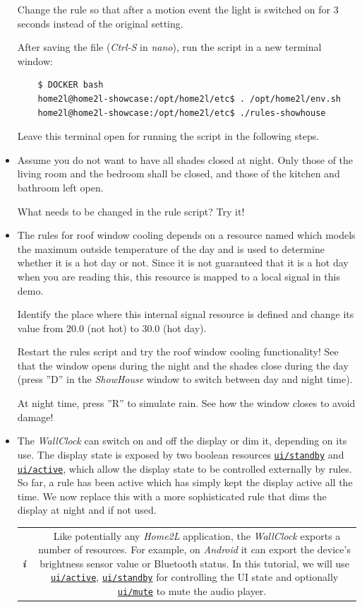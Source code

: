 \documentclass[12pt,english,parskip=half,headheight=19pt]{scrreprt}
\newcommand{\lst}[1]{\colorbox{lstbackground}{\footnotesize\code{#1}}}
\newcommand{\infobox}[1]{
  \par
  \medskip
  \hfill
  \setlength\arrayrulewidth{1pt}
  \begin{tabular}[t]{c|c|}
    \parbox{1.8em}{\hfill\textit{\Huge\textbf{i}\,}}
    &
    \,\parbox{0.89\linewidth}{\setlength{\parskip}{0.5em} \small #1}\,
  \end{tabular}
  \medskip
  \par
}
\newcommand{\refrc}[1]{\hyperref[rc:#1]{\texttt{#1}}}
\begin{document}
\begin{itemize}[$\blacktriangleright$]
  Change the rule so that after a motion event the light is switched on for 3 seconds instead of
  the original setting.

  After saving the file (\textit{Ctrl-S} in \textit{nano}), run the script in a new terminal window:
  \begin{lstlisting}
    $ DOCKER bash
    home2l@home2l-showcase:/opt/home2l/etc$ . /opt/home2l/env.sh
    home2l@home2l-showcase:/opt/home2l/etc$ ./rules-showhouse
  \end{lstlisting}

  Leave this terminal open for running the script in the following steps.

\item
  Assume you do not want to have all shades closed at night. Only those of the living room
  and the bedroom shall be closed, and those of the kitchen and bathroom left open.

  What needs to be changed in the rule script? Try it!

\item
  The rules for roof window cooling depends on a resource named \lst{rcTempDayMaxOutside}
  which models the maximum outside temperature of the day and is used to determine whether
  it is a hot day or not. Since it is not guaranteed that it is a hot day when you are reading
  this, this resource is mapped to a local signal in this demo.

  Identify the place where this internal signal resource is defined and change its value from
  20.0 (not hot) to 30.0 (hot day).

  Restart the rules script and try the roof window cooling functionality!
  See that the window opens during the night and the shades close during the day
  (press ''D'' in the \textit{ShowHouse} window to switch between day and night time).

  At night time, press ''R'' to simulate rain. See how the window closes to avoid damage!

\item
  The \textit{WallClock} can switch on and off the display or dim it, depending on its use. The display state
  is exposed by two boolean resources \refrc{ui/standby} and \refrc{ui/active}, which allow the display state to
  be controlled externally by rules. So far, a rule has been active which has simply kept the display active all the
  time. We now replace this with a more sophisticated rule that dims the display at night and if not used.

  \infobox{
    Like potentially any \textit{Home2L} application, the \textit{WallClock}
    exports a number of resources. For example, on \textit{Android} it can export
    the device's brightness sensor value or Bluetooth status. In this tutorial, we will use
    \refrc{ui/active}, \refrc{ui/standby} for controlling the UI state and optionally
    \refrc{ui/mute} to mute the audio player.
  }


\end{itemize}
\end{document}
